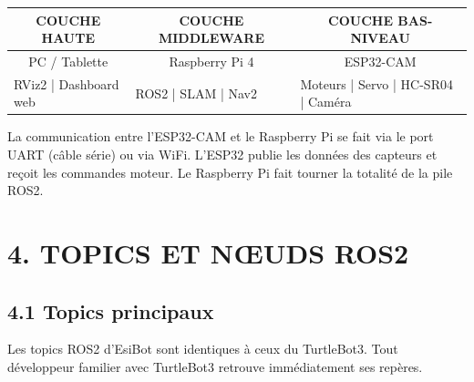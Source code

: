 \documentclass[12pt,a4paper]{article}
\begin{document}
\begin{center}
\begin{tabular}{|p{4cm}|p{4cm}|p{4cm}|}
\hline
\multicolumn{1}{|c|}{\textbf{COUCHE HAUTE}} & \multicolumn{1}{c|}{\textbf{COUCHE MIDDLEWARE}} & \multicolumn{1}{c|}{\textbf{COUCHE BAS-NIVEAU}} \\
\hline
\multicolumn{1}{|c|}{PC / Tablette} & \multicolumn{1}{c|}{Raspberry Pi 4} & \multicolumn{1}{c|}{ESP32-CAM} \\
\hline
RViz2 | Dashboard web & ROS2 | SLAM | Nav2 & Moteurs | Servo | HC-SR04 | Caméra \\
\hline
\end{tabular}
\end{center}

La communication entre l'ESP32-CAM et le Raspberry Pi se fait via le port UART (câble série) ou via WiFi. L'ESP32 publie les données des capteurs et reçoit les commandes moteur. Le Raspberry Pi fait tourner la totalité de la pile ROS2.

\section{4. TOPICS ET NŒUDS ROS2}

\subsection{4.1 Topics principaux}

Les topics ROS2 d'EsiBot sont identiques à ceux du TurtleBot3. Tout développeur familier avec TurtleBot3 retrouve immédiatement ses repères.
\end{document}
